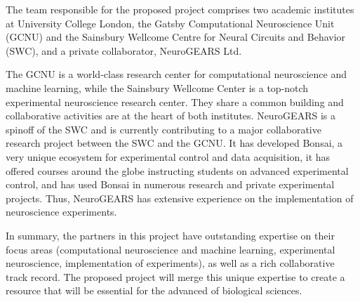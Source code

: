 The team responsible for the proposed project comprises two academic
institutes at University College London, the Gatsby Computational Neuroscience Unit (GCNU) and the Sainsbury
Wellcome Centre for Neural Circuits and Behavior (SWC), and a private
collaborator, NeuroGEARS Ltd.

The GCNU is a world-class research center for computational neuroscience and
machine learning, while the Sainsbury Wellcome Center is a top-notch experimental
neuroscience research center. They share a common building and collaborative
activities are at the heart of both institutes.
%
NeuroGEARS is a spinoff of the SWC and is currently contributing to a major
collaborative research project between the SWC and the GCNU. It has developed
Bonsai, a very unique ecosystem for experimental control and data acquisition,
it has offered courses around the globe instructing students on advanced
experimental control, and has used Bonsai in numerous research and private
experimental projects. Thus, NeuroGEARS has extensive experience on the
implementation of neuroscience experiments.

In summary, the partners in this project have outstanding expertise on their
focus areas (computational neuroscience and machine learning, experimental
neuroscience, implementation of experiments), as well as a rich collaborative
track record. The proposed project will merge this unique expertise to create a
resource that will be essential for the advanced of biological sciences.
